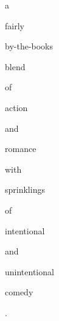 \documentclass[varwidth]{standalone}
\begin{document}
\begin{CJK*}{UTF8}{gbsn}
{\setlength{\fboxsep}{0pt}\colorbox{white!0}{\parbox{0.9\textwidth}{
\colorbox{red!87.5}{\strut a} \colorbox{red!75.0}{\strut fairly} \colorbox{red!56.25}{\strut by-the-books} \colorbox{red!93.75}{\strut blend} \colorbox{red!50.0}{\strut of} \colorbox{red!18.75}{\strut action} \colorbox{red!43.75}{\strut and} \colorbox{red!37.5}{\strut romance} \colorbox{red!81.25}{\strut with} \colorbox{red!62.5}{\strut sprinklings} \colorbox{red!68.75}{\strut of} \colorbox{red!6.25}{\strut intentional} \colorbox{red!25.0}{\strut and} \colorbox{red!31.25}{\strut unintentional} \colorbox{red!12.5}{\strut comedy} \colorbox{red!0.0}{\strut .} 
}}}
\end{CJK*}
\end{document}
